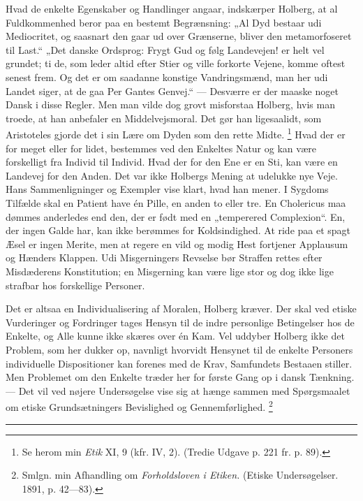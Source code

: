\documentclass[12pt,a4paper,openany]{book}
\newcommand{\opage}[1]{\marginnote{\footnotesize\textit{[#1]}}}
\begin{document}
Hvad de enkelte Egenskaber og Handlinger angaar, indskærper Holberg, at al
Fuldkommenhed beror paa en bestemt Begrænsning: „Al Dyd bestaar udi
Mediocritet, og saasnart den gaar ud over Grænserne, bliver den metamorfoseret
til Last.“ „Det danske Ordsprog: Frygt Gud og følg Landevejen! er helt vel
grundet; ti de, som leder altid efter Stier og ville forkorte Vejene, komme
oftest senest frem. Og det er om saadanne konstige Vandringsmænd, man her udi
Landet siger, at de gaa Per Gantes Genvej.“ --- Desværre er der maaske noget
Dansk i disse Regler. Men man vilde dog grovt misforstaa Holberg, hvis man
troede, at han anbefaler en Middelvejsmoral. Det gør han ligesaalidt, som
Aristoteles gjorde det i sin Lære om Dyden som den rette Midte.%
\footnote[1]{Se herom min \textit{Etik} XI, 9 (kfr. IV, 2). (Tredie Udgave p.
221 fr. p. 89).} Hvad der er for meget eller for lidet, bestemmes ved den
Enkeltes Natur og kan være forskelligt fra Individ til Individ. Hvad der for
den Ene er en Sti, kan være en Landevej for den Anden. Det var ikke Holbergs
Mening at udelukke nye Veje. Hans Sammenligninger og Exempler vise klart, hvad
han mener. I Sygdoms Tilfælde skal en Patient have én Pille, en anden to eller
tre. En Cholericus maa dømmes anderledes end den, der er født med en
„temperered Complexion“. En, der ingen Galde har, kan ikke berømmes for
Koldsindighed. At ride paa et spagt Æsel er ingen Merite, men at regere en vild
og modig Hest fortjener Applausum og Hænders Klappen. Udi Misgerningers
Revselse bør Straffen rettes efter Misdæderens Konstitution; en Misgerning kan
være lige stor og dog ikke lige strafbar hos forskellige Personer.

\setcounter{footnote}{0}%
\opage{12}Det er altsaa en Individualisering af Moralen, Holberg kræver. Der
skal ved etiske Vurderinger og Fordringer tages Hensyn til de indre personlige
Betingelser hos de Enkelte, og Alle kunne ikke skæres over én Kam. Vel uddyber
Holberg ikke det Problem, som her dukker op, navnligt hvorvidt Hensynet til de
enkelte Personers individuelle Dispositioner kan forenes med de Krav,
Samfundets Bestaaen stiller. Men Problemet om den Enkelte træder her for første
Gang op i dansk Tænkning. --- Det vil ved nøjere Undersøgelse vise sig at hænge
sammen med Spørgsmaalet om etiske Grundsætningers Bevislighed og Gennemførlighed.%
\footnote[1]{Smlgn. min Afhandling om \textit{Forholdsloven i Etiken.} (Etiske
Undersøgelser. 1891, p. 42---83).}

\begin{center}\rule{2cm}{0.4pt}\end{center}
\end{document}
